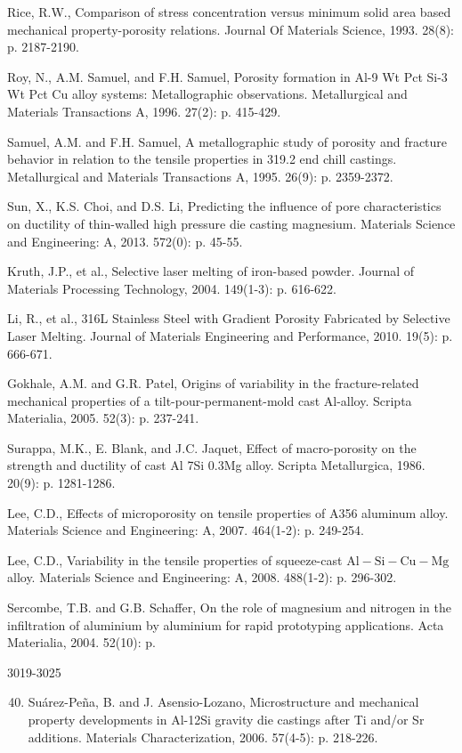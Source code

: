 \documentclass[10pt]{article}
\begin{document}
Rice, R.W., Comparison of stress concentration versus minimum solid area based mechanical property-porosity relations. Journal Of Materials Science, 1993. 28(8): p. 2187-2190.

Roy, N., A.M. Samuel, and F.H. Samuel, Porosity formation in Al-9 Wt Pct Si-3 Wt Pct Cu alloy systems: Metallographic observations. Metallurgical and Materials Transactions A, 1996. 27(2): p. 415-429.

Samuel, A.M. and F.H. Samuel, A metallographic study of porosity and fracture behavior in relation to the tensile properties in 319.2 end chill castings. Metallurgical and Materials Transactions A, 1995. 26(9): p. 2359-2372.

Sun, X., K.S. Choi, and D.S. Li, Predicting the influence of pore characteristics on ductility of thin-walled high pressure die casting magnesium. Materials Science and Engineering: A, 2013. 572(0): p. 45-55.

Kruth, J.P., et al., Selective laser melting of iron-based powder. Journal of Materials Processing Technology, 2004. 149(1-3): p. 616-622.

Li, R., et al., 316L Stainless Steel with Gradient Porosity Fabricated by Selective Laser Melting. Journal of Materials Engineering and Performance, 2010. 19(5): p. 666-671.

Gokhale, A.M. and G.R. Patel, Origins of variability in the fracture-related mechanical properties of a tilt-pour-permanent-mold cast Al-alloy. Scripta Materialia, 2005. 52(3): p. 237-241.

Surappa, M.K., E. Blank, and J.C. Jaquet, Effect of macro-porosity on the strength and ductility of cast Al 7Si 0.3Mg alloy. Scripta Metallurgica, 1986. 20(9): p. 1281-1286.

Lee, C.D., Effects of microporosity on tensile properties of A356 aluminum alloy. Materials Science and Engineering: A, 2007. 464(1-2): p. 249-254.

Lee, C.D., Variability in the tensile properties of squeeze-cast $\mathrm{Al}-\mathrm{Si}-\mathrm{Cu}-\mathrm{Mg}$ alloy. Materials Science and Engineering: A, 2008. 488(1-2): p. 296-302.

Sercombe, T.B. and G.B. Schaffer, On the role of magnesium and nitrogen in the infiltration of aluminium by aluminium for rapid prototyping applications. Acta Materialia, 2004. 52(10): p.

3019-3025

\begin{enumerate}
  \setcounter{enumi}{39}
  \item Suárez-Peña, B. and J. Asensio-Lozano, Microstructure and mechanical property developments in Al-12Si gravity die castings after Ti and/or Sr additions. Materials Characterization, 2006. 57(4-5): p. 218-226.
\end{enumerate}
\end{document}
